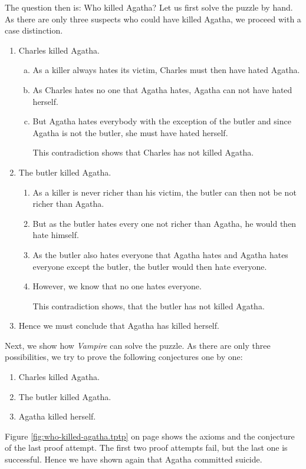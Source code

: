 \noindent
The question then is: Who killed Agatha?  Let us first solve the puzzle by hand.  As there are only three
suspects who could have killed Agatha, we proceed with a case distinction.
\begin{enumerate}
\item Charles killed Agatha.
  \begin{enumerate}[(a)]
  \item As a killer always hates its victim, Charles must then have hated Agatha.
  \item As Charles hates no one that Agatha hates, Agatha can not have hated herself.
  \item But Agatha hates everybody with the exception of the butler and since Agatha is not the
        butler, she must have hated herself.

        This contradiction shows that Charles has not killed Agatha.
  \end{enumerate}
\item The butler killed Agatha.
  \begin{enumerate}
  \item As a killer is never richer than his victim, the butler can then not be not richer than Agatha.
  \item But as the butler hates every one not richer than Agatha, he would then hate himself.
  \item As the butler also hates everyone that Agatha hates and Agatha hates everyone except the butler,
        the butler would then hate everyone.
  \item However, we know that no one hates everyone.

        This contradiction shows, that the butler has not killed Agatha.      
  \end{enumerate}
\item Hence we must conclude that Agatha has killed herself.
\end{enumerate}
Next, we show how \textsl{Vampire} can solve the puzzle.
As there are only three possibilities, we try to prove the following conjectures one by one:
\begin{enumerate}
\item Charles killed Agatha.
\item The butler killed Agatha.
\item Agatha killed herself.
\end{enumerate}
Figure \ref{fig:who-killed-agatha.tptp} on page \pageref{fig:who-killed-agatha.tptp} shows the axioms
and the conjecture of the last proof attempt.  The first two proof attempts fail, but the last one is
successful.  Hence we have shown again that Agatha committed suicide. 

